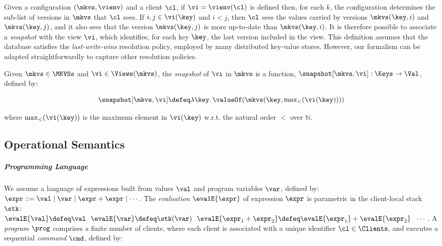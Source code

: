 Given a configuration \((\mkvs, \vienv)\) and a client \(\cl\), 
if \(\vi = \vienv(\cl)\) is defined then, for each \(k\),  the
configuration determines the sub-list of versions in \(\mkvs\) that \(\cl\) sees.
If \(i,j \in \vi(\key)\) and \(i < j\), then \(\cl\) sees the values 
carried by versions \(\mkvs(\key, i)\) and  \(\mkvs(\key, j)\), 
and it also sees that the version \(\mkvs(\key, j)\) is more up-to-date than \(\mkvs(\key, i)\). 
It is therefore possible to associate a \emph{snapshot} with the view \(\vi\), 
which identifies, for each key \(\key\), the last version included in the view. 
This definition assumes that the database satisfies the \emph{last-write-wins}
resolution policy, employed by many distributed key-value stores.
However, our formalism can be adapted straightforwardly  to capture other resolution policies. 

\begin{definition}
\label{def:snapshot}
Given \(\mkvs \in \MKVSs\) and \(\vi \in \Views(\mkvs)\), the \emph{snapshot} of \(\vi\) in 
\(\mkvs\) is a function, 
\(\snapshot[\mkvs, \vi] : \Keys \to \Val\), 
defined by: 

\SpaceAboveMath[-15pt]
\[\snapshot[\mkvs, \vi] \defeq \lambda \key \ldotp \valueOf(\mkvs(\key, \textstyle \max_{<}(\vi(\key))))\]
\SpaceBelowMath[-15pt]

\noindent
where \(\max_{<}(\vi(\key))\) is the maximum element in \(\vi(\key)\) w.r.t. the natural 
order \(<\) over \(\mathbb{N}\).
\end{definition}
\SpaceBelowDef

\subsection{Operational Semantics}
\label{subsec:kv-store-op}

\subparagraph*{Programming Language}
We assume a language of expressions built from values \( \val \)
and program variables \( \var \), defined by:
\(\expr ::= \val \mid \var \mid \expr + \expr \mid \cdots\).
The \emph{evaluation} \(\evalE{\expr}\) of expression \(\expr\) is parametric in
the client-local stack \( \stk \):
\(
\evalE{\val} \defeq
\val
\ \
\evalE{\var} \defeq
\stk(\var)
\ \
\evalE{\expr_{1} + \expr_{2}} \defeq
\evalE{\expr_{1}} + \evalE{\expr_{2}}
\ \
\cdots 
\).
A \emph{program} \( \prog \) comprises a finite number of clients,
where each client is associated with a unique identifier \( \cl \in \Clients \), 
and executes a sequential \emph{command} \(\cmd\), defined by:

